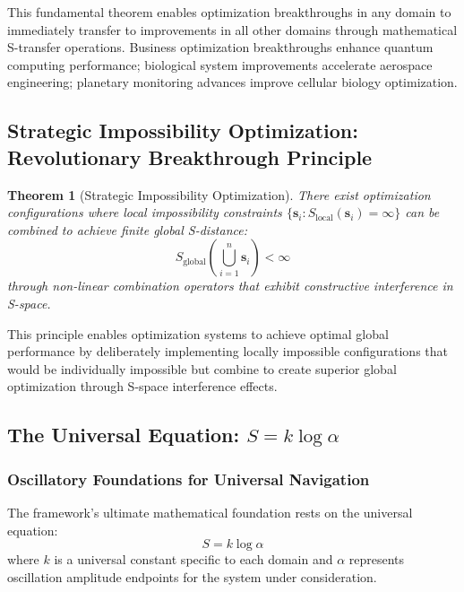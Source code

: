 \documentclass[12pt,a4paper]{article}
\newtheorem{theorem}{Theorem}
\begin{document}
This fundamental theorem enables optimization breakthroughs in any domain to immediately transfer to improvements in all other domains through mathematical S-transfer operations. Business optimization breakthroughs enhance quantum computing performance; biological system improvements accelerate aerospace engineering; planetary monitoring advances improve cellular biology optimization.

\subsection{Strategic Impossibility Optimization: Revolutionary Breakthrough Principle}

\begin{theorem}[Strategic Impossibility Optimization]
There exist optimization configurations where local impossibility constraints $\{\mathbf{s}_i : S_{\text{local}}(\mathbf{s}_i) = \infty\}$ can be combined to achieve finite global S-distance:
\begin{equation}
S_{\text{global}}\left(\bigcup_{i=1}^n \mathbf{s}_i\right) < \infty
\end{equation}
through non-linear combination operators that exhibit constructive interference in S-space.
\end{theorem}

This principle enables optimization systems to achieve optimal global performance by deliberately implementing locally impossible configurations that would be individually impossible but combine to create superior global optimization through S-space interference effects.

\subsection{The Universal Equation: $S = k \log \alpha$}

\subsubsection{Oscillatory Foundations for Universal Navigation}

The framework's ultimate mathematical foundation rests on the universal equation:
\begin{equation}
S = k \log \alpha
\end{equation}
where $k$ is a universal constant specific to each domain and $\alpha$ represents oscillation amplitude endpoints for the system under consideration.
\end{document}
